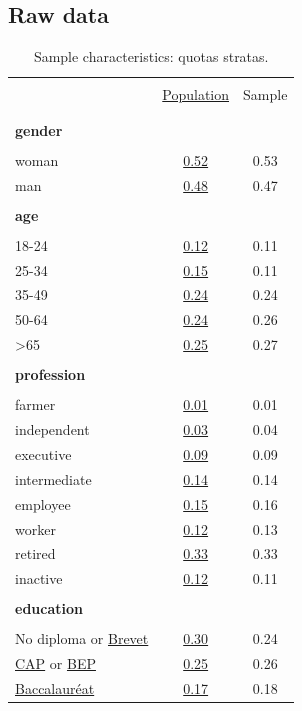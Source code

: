 \documentclass[english,5p,authoryear]{elsarticle}
\renewcommand*\thetable{\Roman{table}}
\begin{document}
%

\newpage
%
%


%

%
%
%
%
%
%
%
%
%
%

%

%
%
\begin{appendices}
\renewcommand{\thetable}{\Alph{section}.\arabic{table}}

\section{Raw data\label{app:Raw-Data}}

\begin{table}[!htbp]
\label{table:sample_characteristics}
\caption{\label{tab:Sample-Characteristics}Sample characteristics: quotas stratas.}
\centering
\begin{tabular}{lcc}
\hline \hline  \\[-1.8ex]
 & \uline{Population} & Sample  \tabularnewline \\[-1.8ex]
\hline  \\[-1.8ex]
\textbf{gender} & & \tabularnewline  \\[-1.8ex]
woman & \uline{0.52} & 0.53\tabularnewline
man & \uline{0.48} & 0.47\tabularnewline
\hline \\[-1.8ex]
\textbf{age} &  & \tabularnewline  \\[-1.8ex]
18-24 & \uline{0.12} & 0.11\tabularnewline
25-34 & \uline{0.15} & 0.11\tabularnewline
35-49 & \uline{0.24} & 0.24\tabularnewline
50-64 & \uline{0.24} & 0.26\tabularnewline
>65 & \uline{0.25} & 0.27\tabularnewline
\hline \\[-1.8ex]
\textbf{profession} &  & \tabularnewline  \\[-1.8ex]
farmer & \uline{0.01} & 0.01\tabularnewline
independent & \uline{0.03} & 0.04\tabularnewline
executive & \uline{0.09} & 0.09\tabularnewline
intermediate & \uline{0.14} & 0.14\tabularnewline
employee & \uline{0.15} & 0.16\tabularnewline
worker & \uline{0.12} & 0.13\tabularnewline
retired & \uline{0.33} & 0.33\tabularnewline
inactive & \uline{0.12} & 0.11\tabularnewline
\hline  \\[-1.8ex]
\textbf{education} &  & \tabularnewline  \\[-1.8ex]
No diploma or \uline{Brevet} & \uline{0.30} & 0.24\tabularnewline
\uline{CAP} or \uline{BEP} & \uline{0.25} & 0.26\tabularnewline
\uline{Baccalauréat} & \uline{0.17} & 0.18\tabularnewline

\end{tabular}
\end{table}
\end{appendices}
\end{document}
